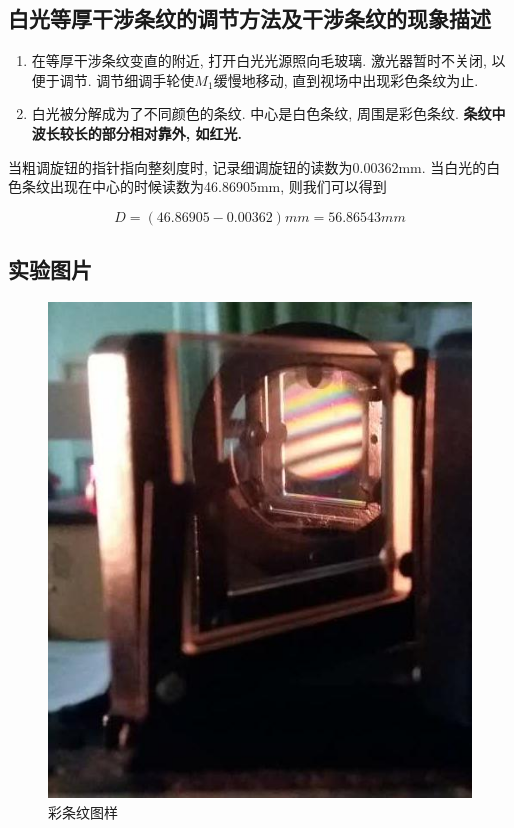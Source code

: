\documentclass[a4paper,10pt,notitlepage]{article}
\begin{document}
\subsection{白光等厚干涉条纹的调节方法及干涉条纹的现象描述}

\begin{enumerate}
	\item 在等厚干涉条纹变直的附近, 打开白光光源照向毛玻璃. 激光器暂时不关闭, 以便于调节. 调节细调手轮使$M_1$缓慢地移动, 直到视场中出现彩色条纹为止. 
	\item 白光被分解成为了不同颜色的条纹. 中心是白色条纹, 周围是彩色条纹. \textbf{条纹中波长较长的部分相对靠外, 如红光.} 
\end{enumerate}

	当粗调旋钮的指针指向整刻度时, 记录细调旋钮的读数为0.00362mm. 当白光的白色条纹出现在中心的时候读数为46.86905mm, 则我们可以得到
	
\begin{equation*}
	D = (46.86905 - 0.00362) mm = 56.86543mm
\end{equation*}

\subsection{实验图片}

\begin{figure}
\centering
	\includegraphics[scale=0.5]{f1.jpg}
	\caption{彩条纹图样}
\end{figure}
\end{document}
